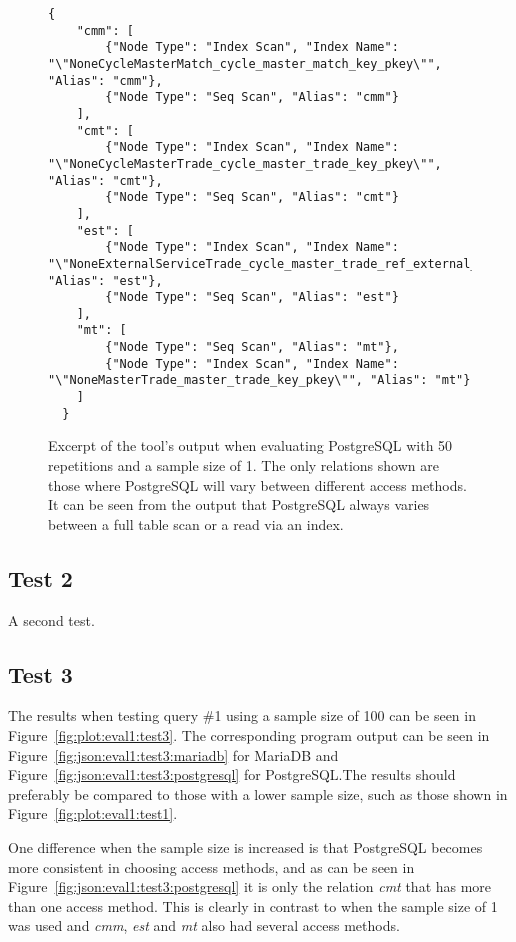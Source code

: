\begin{figure}[ht]
  \begin{verbatim}
{
    "cmm": [
        {"Node Type": "Index Scan", "Index Name": "\"NoneCycleMasterMatch_cycle_master_match_key_pkey\"", "Alias": "cmm"},
        {"Node Type": "Seq Scan", "Alias": "cmm"}
    ],
    "cmt": [
        {"Node Type": "Index Scan", "Index Name": "\"NoneCycleMasterTrade_cycle_master_trade_key_pkey\"", "Alias": "cmt"},
        {"Node Type": "Seq Scan", "Alias": "cmt"}
    ],
    "est": [
        {"Node Type": "Index Scan", "Index Name": "\"NoneExternalServiceTrade_cycle_master_trade_ref_external_servic\"", "Alias": "est"},
        {"Node Type": "Seq Scan", "Alias": "est"}
    ],
    "mt": [
        {"Node Type": "Seq Scan", "Alias": "mt"},
        {"Node Type": "Index Scan", "Index Name": "\"NoneMasterTrade_master_trade_key_pkey\"", "Alias": "mt"}
    ]
  }
\end{verbatim}
  \caption[Excerpt of the tool's output for PostgreSQL with 50 repetitions and a
  sample size of 1.]{Excerpt of the tool's output when evaluating PostgreSQL
    with 50 repetitions and a sample size of 1. The only relations shown are
    those where PostgreSQL will vary between different access methods. It can be
    seen from the output that PostgreSQL always varies between a full table scan or a read
    via an index.}\label{fig:json:eval1:test1:postgresql}
\end{figure}

\subsection{Test 2}
A second test.

\subsection{Test 3}
The results when testing query \#1 using a sample size of 100 can be seen in
Figure~\ref{fig:plot:eval1:test3}. The corresponding program output can be seen
in Figure~\ref{fig:json:eval1:test3:mariadb} for MariaDB and
Figure~\ref{fig:json:eval1:test3:postgresql} for PostgreSQL.\@ The results should
preferably be compared to those with a lower sample size, such as those shown in
Figure~\ref{fig:plot:eval1:test1}.

One difference when the sample size is increased is that PostgreSQL becomes more
consistent in choosing access methods, and as can be seen in
Figure~\ref{fig:json:eval1:test3:postgresql} it is only the relation
\textit{cmt} that has more than one access method. This is clearly in contrast
to when the sample size of 1 was used and \textit{cmm}, \textit{est} and
\textit{mt }also had several access methods.

